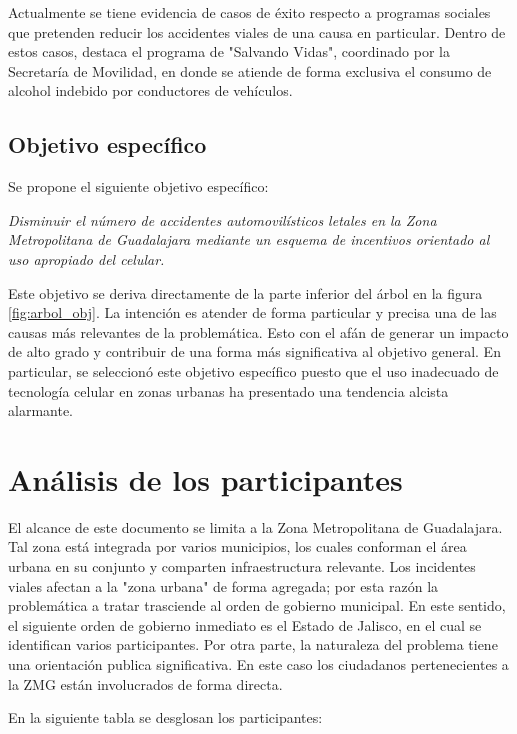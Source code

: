 \documentclass{article}
\newcommand{\forceindent}{\leavevmode{\parindent=1em\indent}}
\begin{document}
Actualmente se tiene evidencia de casos de éxito respecto a programas sociales que pretenden reducir los accidentes viales de una causa en particular. Dentro de estos casos, destaca el programa de "Salvando Vidas", coordinado por la Secretaría de Movilidad, en donde se atiende de forma exclusiva el consumo de alcohol indebido por conductores de vehículos.

\subsection{Objetivo específico}\label{subsec:specific-objs}

Se propone el siguiente objetivo específico:

\forceindent \textit{Disminuir el número de accidentes automovilísticos letales en la Zona Metropolitana de Guadalajara mediante un esquema de incentivos orientado al uso apropiado del celular.}

Este objetivo se deriva directamente de la parte inferior del árbol en la figura \ref{fig:arbol_obj}. La intención es atender de forma particular y precisa una de las causas más relevantes de la problemática. Esto con el afán de generar un impacto de alto grado y contribuir de una forma más significativa al objetivo general. En particular, se seleccionó este objetivo específico puesto que el uso inadecuado de tecnología celular en zonas urbanas ha presentado una tendencia alcista alarmante.


\newpage
\section{Análisis de los participantes}\label{sec:participants}

El alcance de este documento se limita a la Zona Metropolitana de Guadalajara. Tal zona está integrada por varios municipios, los cuales conforman el área urbana en su conjunto y comparten infraestructura relevante. Los incidentes viales afectan a la "zona urbana" de forma agregada; por esta razón la problemática a tratar trasciende al orden de gobierno municipal. En este sentido, el siguiente orden de gobierno inmediato es el Estado de Jalisco, en el cual se identifican varios participantes. Por otra parte, la naturaleza del problema tiene una orientación publica significativa. En este caso los ciudadanos pertenecientes a la ZMG están involucrados de forma directa. 

En la siguiente tabla se desglosan los participantes:
\end{document}
